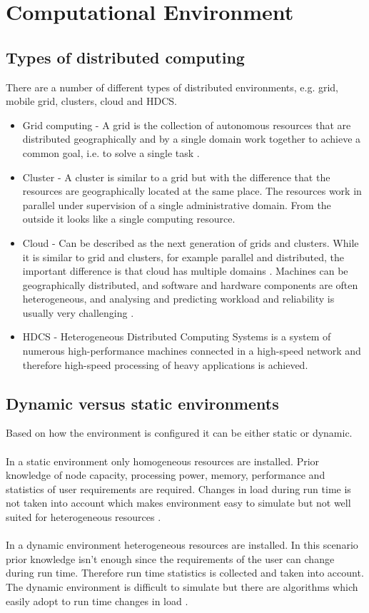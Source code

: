 \documentclass{cslthse-msc}
\begin{document}
\section{Computational Environment}
\subsection{Types of distributed computing}
There are a number of different types of distributed environments, e.g. grid, mobile grid, clusters, cloud and HDCS.
\begin{itemize}
\item Grid computing - A grid is the collection of autonomous resources that are distributed geographically and by a single domain work together to achieve a common goal, i.e. to solve a single task \cite{compStudyLoadAndCloud}.
\item Cluster - A cluster is similar to a grid but with the difference that the resources are geographically located at the same place. The resources work in parallel under supervision of a single administrative domain. From the outside it looks like a single computing resource. \cite{compStudyLoadAndCloud}
\item Cloud - Can be described as the next generation of grids and clusters. While it is similar to grid and clusters, for example parallel and distributed, the important difference is that cloud has multiple domains \cite{compStudyLoadAndCloud}. Machines can be geographically distributed, and software and hardware components are often heterogeneous, and analysing and predicting workload and reliability is usually very challenging \cite{surveyReliabilityDistr}. 
\item HDCS - Heterogeneous Distributed Computing Systems is a system of numerous high-performance machines connected in a high-speed network and therefore high-speed processing of heavy applications is achieved.
\end{itemize}

\subsection{Dynamic versus static environments}
Based on how the environment is configured it can be either static or dynamic. 
\\\\
In a static environment only homogeneous resources are installed. Prior knowledge of node capacity, processing power, memory, performance and statistics of user requirements are required. Changes in load during run time is not taken into account which makes environment easy to simulate but not well suited for heterogeneous resources \cite{compStudyLoadAndCloud}.
\\\\
In a dynamic environment heterogeneous resources are installed. In this scenario prior knowledge isn't enough since the requirements of the user can change during run time. Therefore run time statistics is collected and taken into account. The dynamic environment is difficult to simulate but there are algorithms which easily adopt to run time changes in load \cite{compStudyLoadAndCloud}.
\end{document}
